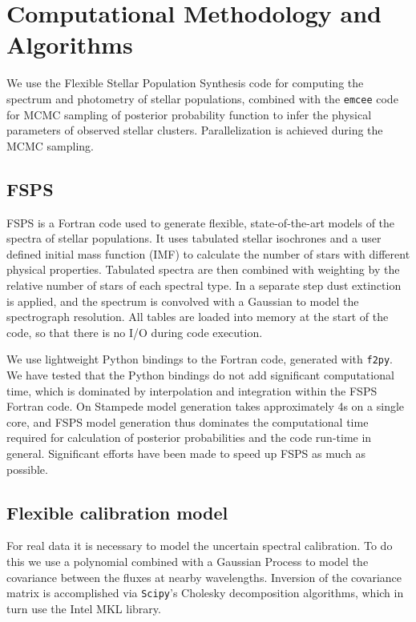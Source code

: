\documentclass[11pt,preprint]{aastex}
\begin{document}
\section{ Computational Methodology and Algorithms}
We use the Flexible Stellar Population Synthesis \citep[FSPS;][]{fspsI, fspsIII} code for computing the spectrum and photometry of stellar populations, combined with the \texttt{emcee} code for MCMC sampling of posterior probability function to infer the physical parameters of observed stellar clusters.  Parallelization is achieved during the MCMC sampling.

\subsection{FSPS}
FSPS is a Fortran code used to generate flexible, state-of-the-art models of the spectra of stellar populations.  It uses tabulated stellar isochrones and a user defined initial mass function (IMF) to calculate the number of stars with different physical properties.  Tabulated spectra are then combined with weighting by the relative number of stars of each spectral type.  In a separate step dust extinction is applied, and the spectrum is convolved with a Gaussian to model the spectrograph resolution.  All tables are loaded into memory at the start of the code, so that there is no I/O during code execution.

We use lightweight Python bindings to the Fortran code, generated with \texttt{f2py}.  We have tested that the Python bindings do not add significant computational time, which is dominated by interpolation and integration within the FSPS Fortran code.  On Stampede model generation takes approximately 4s on a single core, and FSPS model generation thus dominates the computational time required for calculation of posterior probabilities and the code run-time in general. Significant efforts have been made to speed up FSPS as much as possible.

\subsection{Flexible calibration model}
For real data it is necessary to model the uncertain spectral calibration.  To do this we use a polynomial combined with a Gaussian Process \citep[e.g.,][]{RW} to model the covariance between the fluxes at nearby wavelengths.  Inversion of the covariance matrix is accomplished via \texttt{Scipy}'s Cholesky decomposition algorithms, which in turn use the Intel MKL library.
\end{document}
